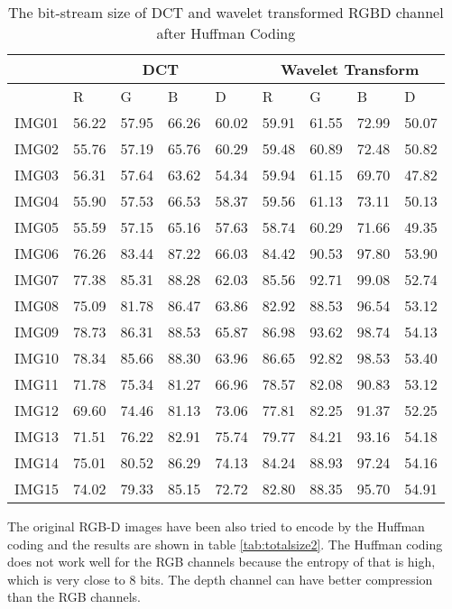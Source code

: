 \begin{table*}
\center
\begin{tabular}{|l|l|l|l|l|l|l|l|l|}\hline
& \multicolumn{4}{|c|}{DCT} & \multicolumn{4}{|c|}{Wavelet Transform} \\\hline
& R & G & B & D & R & G & B & D  \\\hline
IMG01 & 56.22 & 57.95 & 66.26 & 60.02 & 59.91 & 61.55 & 72.99 & 50.07\\\hline
IMG02 & 55.76 & 57.19 & 65.76 & 60.29 & 59.48 & 60.89 & 72.48 & 50.82\\\hline
IMG03 & 56.31 & 57.64 & 63.62 & 54.34 & 59.94 & 61.15 & 69.70 & 47.82\\\hline
IMG04 & 55.90 & 57.53 & 66.53 & 58.37 & 59.56 & 61.13 & 73.11 & 50.13\\\hline
IMG05 & 55.59 & 57.15 & 65.16 & 57.63 & 58.74 & 60.29 & 71.66 & 49.35\\\hline
IMG06 & 76.26 & 83.44 & 87.22 & 66.03 & 84.42 & 90.53 & 97.80 & 53.90\\\hline
IMG07 & 77.38 & 85.31 & 88.28 & 62.03 & 85.56 & 92.71 & 99.08 & 52.74\\\hline
IMG08 & 75.09 & 81.78 & 86.47 & 63.86 & 82.92 & 88.53 & 96.54 & 53.12\\\hline
IMG09 & 78.73 & 86.31 & 88.53 & 65.87 & 86.98 & 93.62 & 98.74 & 54.13\\\hline
IMG10 & 78.34 & 85.66 & 88.30 & 63.96 & 86.65 & 92.82 & 98.53 & 53.40\\\hline
IMG11 & 71.78 & 75.34 & 81.27 & 66.96 & 78.57 & 82.08 & 90.83 & 53.12\\\hline
IMG12 & 69.60 & 74.46 & 81.13 & 73.06 & 77.81 & 82.25 & 91.37 & 52.25\\\hline
IMG13 & 71.51 & 76.22 & 82.91 & 75.74 & 79.77 & 84.21 & 93.16 & 54.18\\\hline
IMG14 & 75.01 & 80.52 & 86.29 & 74.13 & 84.24 & 88.93 & 97.24 & 54.16\\\hline
IMG15 & 74.02 & 79.33 & 85.15 & 72.72 & 82.80 & 88.35 & 95.70 & 54.91\\\hline
\end{tabular}
\caption{The bit-stream size of DCT and wavelet transformed RGBD channel after Huffman Coding}
\label{tab:totalsize1}
\end{table*}

The original RGB-D images have been also tried to encode by the Huffman coding 
and the results are shown in table \ref{tab:totalsize2}. The Huffman coding does not work well for the 
RGB channels because the entropy of that is high, which is very close to 8 bits. The 
depth channel can have better compression than the RGB channels.

